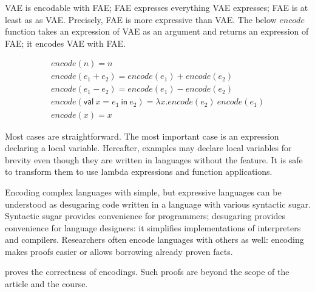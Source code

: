 VAE is encodable with FAE; FAE expresses everything VAE expresses; FAE is at
least as  as VAE. Precisely, FAE is more expressive than VAE.
The below \(\mathit{encode}\) function takes an expression of VAE as an argument
and returns an expression of FAE; it encodes VAE with FAE.

\[
\begin{array}{l}
\mathit{encode}(n)=n \\
\mathit{encode}(e_1+e_2)=\mathit{encode}(e_1)+\mathit{encode}(e_2) \\
\mathit{encode}(e_1-e_2)=\mathit{encode}(e_1)-\mathit{encode}(e_2) \\
\mathit{encode}(\textsf{val}\ x = e_1\ \textsf{in}\ e_2)=
\lambda x.\mathit{encode}(e_2)\ \mathit{encode}(e_1) \\
\mathit{encode}(x)=x
\end{array}
\]

Most cases are straightforward. The most important case is an expression
declaring a local variable. Hereafter, examples may declare local variables for
brevity even though they are written in languages without the feature. It is safe
to transform them to use lambda expressions and function applications.

Encoding complex languages with simple, but expressive languages can be
understood as desugaring code written in a language with various syntactic sugar.
Syntactic sugar provides convenience for programmers; desugaring provides
convenience for language designers: it simplifies implementations of interpreters
and compilers. Researchers often encode languages with others as well: encoding
makes proofs easier or allows borrowing already proven facts.

 proves the correctness of encodings. Such proofs are
beyond the scope of the article and the course.
